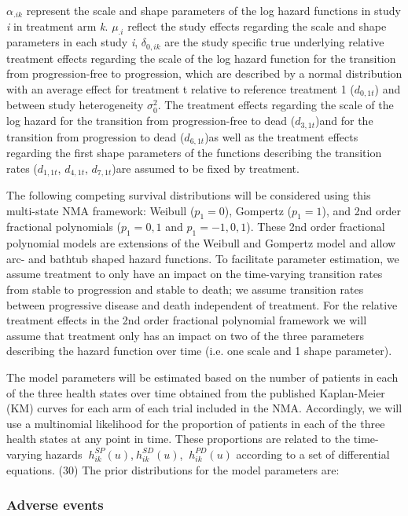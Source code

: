 \documentclass[11pt,final,fleqn]{article}\usepackage[]{graphicx}\usepackage[]{color}
\theoremstyle{plain}
\begin{document}
{\begin{appendices}
$\alpha_{.ik} $ represent the scale and shape parameters of the log hazard functions in study \textit{i} in treatment arm \textit{k}. $\mu_{.i} $ reflect the study effects regarding the scale and shape parameters in each study \textit{i}, $\delta_{0,ik} $ are the study specific true underlying relative treatment effects regarding the scale of the log hazard function for the transition from progression-free to progression, which are described by a normal distribution with an average effect for treatment t relative to reference treatment 1 (${d_{0,1t}}$) and between study heterogeneity $\sigma_{0}^{2} $. The treatment effects regarding the scale of the log hazard for the transition from progression-free to dead (${d_{3,1t}}$)and for the transition from progression to dead (${d_{6,1t}}$)as well as the treatment effects regarding the first shape parameters of the functions describing the transition rates (${d_{1,1t}}$, $d_{4,1t}$, $d_{7,1t}$)are assumed to be fixed by treatment.

The following competing survival distributions will be considered using this multi-state NMA framework: Weibull ($p_{1}=0$), Gompertz ($p_{1}=1$), and 2nd order fractional polynomials ($p_{1}={0,1}$ and $p_{1}={-1,0,1}$). These 2nd order fractional polynomial models are extensions of the Weibull and Gompertz model and allow arc- and bathtub shaped hazard functions. To facilitate parameter estimation, we assume treatment to only have an impact on the time-varying transition rates from stable to progression and stable to death; we assume transition rates between progressive disease and death independent of treatment. For the relative treatment effects in the 2nd order fractional polynomial framework we will assume that treatment only has an impact on two of the three parameters describing the hazard function over time (i.e. one scale and 1 shape parameter).

The model parameters will be estimated based on the number of patients in each of the three health states over time obtained from the published Kaplan-Meier (KM) curves for each arm of each trial included in the NMA. Accordingly, we will use a multinomial likelihood for the proportion of patients in each of the three health states at any point in time. These proportions are related to the time-varying hazards $\ h_{ik}^{SP} (u) $,$\ h_{ik}^{SD} (u) $, $\ h_{ik}^{PD} (u)$ according to a set of differential equations. (30) The prior distributions for the model parameters are:

\subsubsection*{Adverse events}


\end{appendices}}
\end{document}
